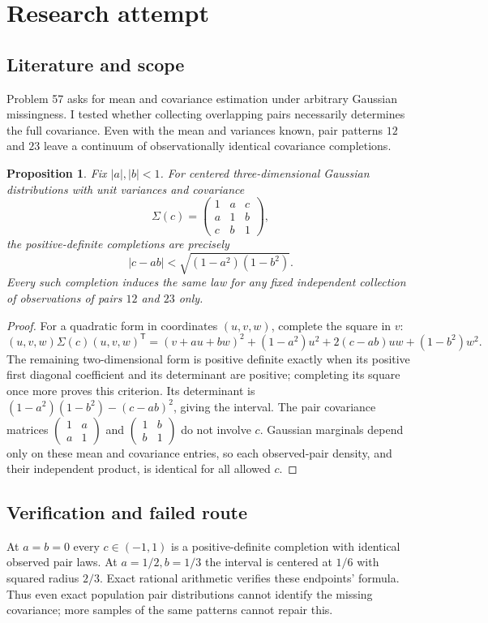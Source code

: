 \documentclass[11pt]{article}
\newtheorem{proposition}{Proposition}
\begin{document}
\section{Research attempt}
\subsection{Literature and scope}
Problem 57 asks for mean and covariance estimation under arbitrary Gaussian missingness. I tested whether collecting overlapping pairs necessarily determines the full covariance. Even with the mean and variances known, pair patterns $12$ and $23$ leave a continuum of observationally identical covariance completions.
\begin{proposition}
Fix $|a|,|b|<1$. For centered three-dimensional Gaussian distributions with unit variances and covariance
\[
\Sigma(c)=\begin{pmatrix}1&a&c\\a&1&b\\c&b&1\end{pmatrix},
\]
the positive-definite completions are precisely
\[
|c-ab|<\sqrt{(1-a^2)(1-b^2)}.
\]
Every such completion induces the same law for any fixed independent collection of observations of pairs $12$ and $23$ only.
\end{proposition}
\begin{proof}
For a quadratic form in coordinates $(u,v,w)$, complete the square in $v$:
\[
(u,v,w)\Sigma(c)(u,v,w)^{\mathsf T}
=(v+au+bw)^2+(1-a^2)u^2+2(c-ab)uw+(1-b^2)w^2.
\]
The remaining two-dimensional form is positive definite exactly when its positive first diagonal coefficient and its determinant are positive; completing its square once more proves this criterion. Its determinant is $(1-a^2)(1-b^2)-(c-ab)^2$, giving the interval. The pair covariance matrices $\left(\begin{smallmatrix}1&a\\a&1\end{smallmatrix}\right)$ and $\left(\begin{smallmatrix}1&b\\b&1\end{smallmatrix}\right)$ do not involve $c$. Gaussian marginals depend only on these mean and covariance entries, so each observed-pair density, and their independent product, is identical for all allowed $c$.
\end{proof}
\subsection{Verification and failed route}
At $a=b=0$ every $c\in(-1,1)$ is a positive-definite completion with identical observed pair laws. At $a=1/2,b=1/3$ the interval is centered at $1/6$ with squared radius $2/3$. Exact rational arithmetic verifies these endpoints' formula. Thus even exact population pair distributions cannot identify the missing covariance; more samples of the same patterns cannot repair this.
\end{document}
